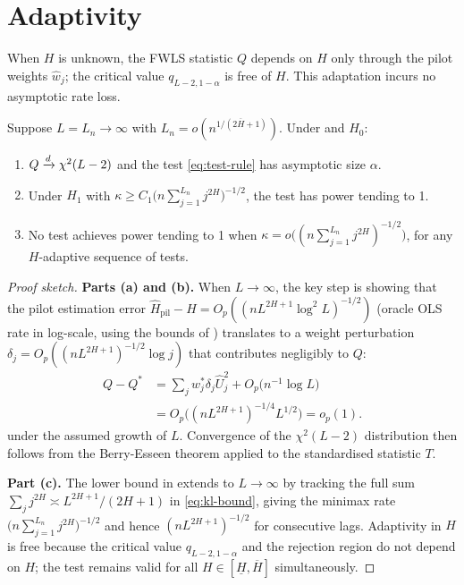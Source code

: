\section{Adaptivity}
\label{sec:adaptivity}

When $H$ is unknown, the FWLS statistic $Q$ depends on $H$ only through the
pilot weights $\hat w_j$; the critical value $q_{L-2,1-\alpha}$ is free of
$H$.  This adaptation incurs no asymptotic rate loss.

\begin{theorem}
\label{thm:adaptivity}
Suppose $L = L_n \to \infty$ with $L_n = o(n^{1/(2\overline{H}+1)})$.
Under  and $H_0$:
\begin{enumerate}[label=(\alph*)]
    \item $Q \xrightarrow{d} \chi^2(L-2)$ and the test \eqref{eq:test-rule} has
    asymptotic size $\alpha$.
    \item Under $H_1$ with
    $\kappa \geq C_1 \bigl(n\sum_{j=1}^{L_n} j^{2H}\bigr)^{-1/2}$,
    the test has power tending to 1.
    \item No test achieves power tending to 1 when
    $\kappa = o\bigl((n\sum_{j=1}^{L_n} j^{2H})^{-1/2}\bigr)$, for any
    $H$-adaptive sequence of tests.
\end{enumerate}
\end{theorem}

\begin{proof}[Proof sketch]
\textbf{Parts (a) and (b).}
When $L \to \infty$, the key step is showing that the pilot estimation
error $\hat H_{\mathrm{pil}} - H = O_p((nL^{2H+1}\log^2 L)^{-1/2})$
(oracle OLS rate in log-scale, using the bounds of )
translates to a weight perturbation $\delta_j = O_p((nL^{2H+1})^{-1/2}
\log j)$ that contributes negligibly to $Q$:
\begin{align*}
    Q - Q^* &= \sum_j w_j^* \delta_j \hat U_j^2 + O_p\bigl(n^{-1}\log L\bigr) \\
            &= O_p\bigl((nL^{2H+1})^{-1/4} L^{1/2}\bigr) = o_p(1).
\end{align*}
under the assumed growth of $L$.  Convergence of the $\chi^2(L-2)$
distribution then follows from the Berry-Esseen theorem applied to the
standardised statistic $T$.

\textbf{Part (c).}
The lower bound in  extends to $L \to \infty$ by
tracking the full sum $\sum_j j^{2H} \asymp L^{2H+1}/(2H+1)$ in
\eqref{eq:kl-bound}, giving the minimax rate
$\bigl(n\sum_{j=1}^{L_n} j^{2H}\bigr)^{-1/2}$ and hence
$(nL^{2H+1})^{-1/2}$ for consecutive lags.
Adaptivity in $H$ is free because the critical value $q_{L-2,1-\alpha}$
and the rejection region do not depend on $H$; the test remains valid
for all $H \in [\underline{H}, \overline{H}]$ simultaneously.
\end{proof}
